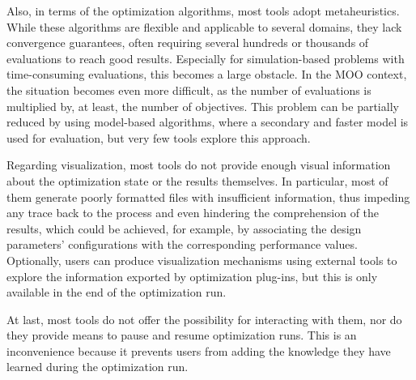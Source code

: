 	
	Also, in terms of the optimization algorithms, most tools adopt metaheuristics. While these algorithms are flexible and applicable to several domains, they lack convergence guarantees, often requiring several hundreds or thousands of evaluations to reach good results. Especially for simulation-based problems with time-consuming evaluations, this becomes a large obstacle. In the \ac{MOO} context, the situation becomes even more difficult, as the number of evaluations is multiplied by, at least, the number of objectives. This problem can be partially reduced by using model-based algorithms, where a secondary and faster model is used for evaluation, but very few tools explore this approach.
	
	Regarding visualization, most tools do not provide enough visual information about the optimization state or the results themselves. In particular, most of them generate poorly formatted files with insufficient information, thus impeding any trace back to the process and even hindering the comprehension of the results, which could be achieved, for example, by associating the design parameters' configurations with the corresponding performance values. Optionally, users can produce visualization mechanisms using external tools to explore the information exported by optimization plug-ins, but this is only available in the end of the optimization run.
	
	At last, most tools do not offer the possibility for interacting with them, nor do they provide means to pause and resume optimization runs. This is an inconvenience because it prevents users from adding the knowledge they have learned during the optimization run.%
	
		
